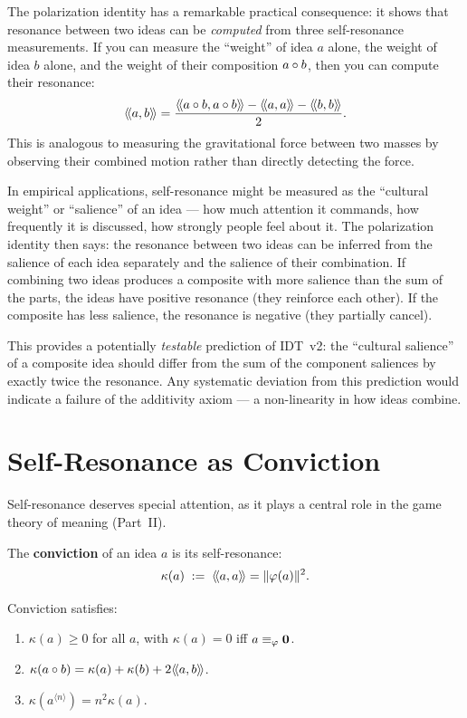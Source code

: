 \begin{interpretation}
\label{interp:polarization}
The polarization identity has a remarkable practical consequence: it shows that
resonance between two ideas can be \emph{computed} from three self-resonance
measurements. If you can measure the ``weight'' of idea $a$ alone, the weight
of idea $b$ alone, and the weight of their composition $a \circ b$, then you
can compute their resonance:
\[
  \rs{a}{b} = \frac{\rs{a \compose b}{a \compose b} - \rs{a}{a} - \rs{b}{b}}{2}.
\]
This is analogous to measuring the gravitational force between two masses by
observing their combined motion rather than directly detecting the force.

In empirical applications, self-resonance might be measured as the ``cultural
weight'' or ``salience'' of an idea --- how much attention it commands, how
frequently it is discussed, how strongly people feel about it. The polarization
identity then says: the resonance between two ideas can be inferred from the
salience of each idea separately and the salience of their combination. If
combining two ideas produces a composite with more salience than the sum of the
parts, the ideas have positive resonance (they reinforce each other). If the
composite has less salience, the resonance is negative (they partially cancel).

This provides a potentially \emph{testable} prediction of IDT~v2: the
``cultural salience'' of a composite idea should differ from the sum of the
component saliences by exactly twice the resonance. Any systematic deviation
from this prediction would indicate a failure of the additivity axiom --- a
non-linearity in how ideas combine.
\end{interpretation}


\section{Self-Resonance as Conviction}

Self-resonance deserves special attention, as it plays a central role in the
game theory of meaning (Part~II).

\begin{definition}[Conviction]
\label{def:conviction}
The \textbf{conviction} of an idea $a$ is its self-resonance:
\[
  \kappa(a) \;:=\; \langle\!\langle a, a \rangle\!\rangle = \lVert \varphi(a) \rVert^2.
\]
\end{definition}

\begin{proposition}
\label{prop:conviction}
Conviction satisfies:
\begin{enumerate}
\item $\kappa(a) \geq 0$ for all $a$, with $\kappa(a) = 0$ iff $a
\equiv_\varphi \mathbf{0}$.
\item $\kappa(a \circ b) = \kappa(a) + \kappa(b) + 2\langle\!\langle a, b \rangle\!\rangle$.
\item $\kappa(a^{\langle n \rangle}) = n^2 \kappa(a)$.
\end{enumerate}
\end{proposition}

